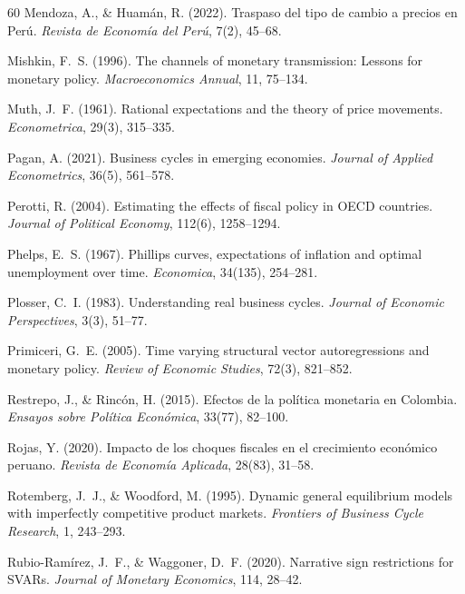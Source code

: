 \documentclass[12pt,a4paper]{article}
\begin{document}
\begin{thebibliography}{60}
 Mendoza, A., \& Huamán, R. (2022). Traspaso del tipo de cambio a precios en Perú. \textit{Revista de Economía del Perú}, 7(2), 45--68.

 Mishkin, F.~S. (1996). The channels of monetary transmission: Lessons for monetary policy. \textit{Macroeconomics Annual}, 11, 75--134.

 Muth, J.~F. (1961). Rational expectations and the theory of price movements. \textit{Econometrica}, 29(3), 315--335.

 Pagan, A. (2021). Business cycles in emerging economies. \textit{Journal of Applied Econometrics}, 36(5), 561--578.

 Perotti, R. (2004). Estimating the effects of fiscal policy in OECD countries. \textit{Journal of Political Economy}, 112(6), 1258--1294.

 Phelps, E.~S. (1967). Phillips curves, expectations of inflation and optimal unemployment over time. \textit{Economica}, 34(135), 254--281.

 Plosser, C.~I. (1983). Understanding real business cycles. \textit{Journal of Economic Perspectives}, 3(3), 51--77.

 Primiceri, G.~E. (2005). Time varying structural vector autoregressions and monetary policy. \textit{Review of Economic Studies}, 72(3), 821--852.

 Restrepo, J., \& Rincón, H. (2015). Efectos de la política monetaria en Colombia. \textit{Ensayos sobre Política Económica}, 33(77), 82--100.

 Rojas, Y. (2020). Impacto de los choques fiscales en el crecimiento económico peruano. \textit{Revista de Economía Aplicada}, 28(83), 31--58.

 Rotemberg, J.~J., \& Woodford, M. (1995). Dynamic general equilibrium models with imperfectly competitive product markets. \textit{Frontiers of Business Cycle Research}, 1, 243--293.

 Rubio-Ramírez, J.~F., \& Waggoner, D.~F. (2020). Narrative sign restrictions for SVARs. \textit{Journal of Monetary Economics}, 114, 28--42.


\end{thebibliography}
\end{document}
